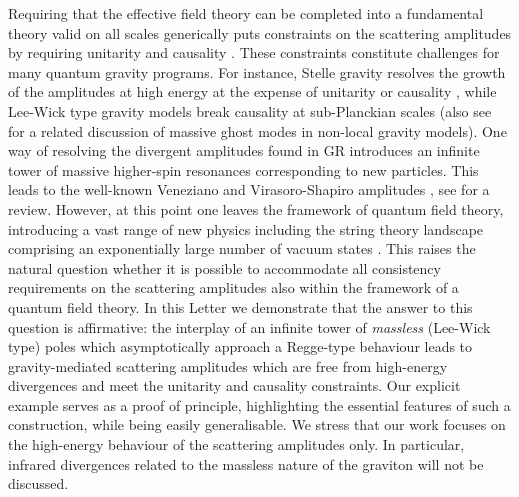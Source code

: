 \documentclass[aps,prl,reprint,twocolumn,superscriptaddress,longbibliography,nofootinbib,floatfix,showpacs]{revtex4-1}
\newcommand{\GR}{{\small GR}}
\begin{document}
Requiring that the effective field theory can be completed into a fundamental theory valid on all scales generically puts constraints on the scattering amplitudes by requiring unitarity and causality \cite{Adams:2006sv, Camanho:2014apa, Bellazzini:2015cra, Chandrasekaran:2018qmx}.
These constraints constitute challenges for many quantum gravity programs.
For instance, Stelle gravity \cite{Stelle:1976gc, Stelle:1977ry} resolves the growth of the amplitudes at high energy at the expense of unitarity or causality \cite{Anselmi:2019nie, Donoghue:2019ecz}, while Lee-Wick type gravity models \cite{Tomboulis:1977jk, Tomboulis:1980bs,Anselmi:2018kgz, Anselmi:2018tmf, Anselmi:2018bra, Anselmi:2020tqo} break causality at sub-Planckian scales (also see \cite{Shapiro:2015uxa,Salles:2018ccb} for a related discussion of massive ghost modes in non-local gravity models).
One way of resolving the divergent amplitudes found in \GR{} introduces an infinite tower of massive higher-spin resonances corresponding to new particles.
This leads to the well-known Veneziano and Virasoro-Shapiro amplitudes \cite{Veneziano:1968yb, Virasoro:1969me, Shapiro:1970gy,Alonso:2019ptb}, see \cite{Green:1987sp} for a review.
However, at this point one leaves the framework of quantum field theory, introducing a vast range of 
new physics including the string theory landscape comprising an exponentially large number of vacuum states \cite{Douglas:2003um, Taylor:2015xtz}.
This raises the natural question whether it is possible to accommodate all consistency requirements on the scattering amplitudes also within the framework of a  quantum field theory.
In this Letter we demonstrate that the answer to this question is affirmative: the interplay of an infinite tower of \emph{massless} (Lee-Wick type) poles which asymptotically approach a Regge-type behaviour leads to gravity-mediated scattering amplitudes which are free from high-energy divergences and meet the unitarity and causality constraints.
Our explicit example serves as a proof of principle, highlighting the essential features of such a construction, while being easily generalisable.
We stress that our work focuses on the high-energy behaviour of the scattering amplitudes only.
In particular, infrared divergences related to the massless nature of the graviton will not be discussed.
\end{document}
